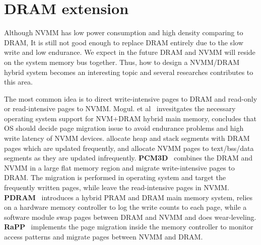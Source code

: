 \section{DRAM extension} 
\label{sec:migration}

Although NVMM has low power consumption and high density comparing to DRAM,
It is still not good enough to replace DRAM entirely due to the slow write
and low endurance. We expect in the future DRAM and NVMM
will reside on the system memory bus together. Thus, how to design a
NVMM/DRAM hybrid system becomes an interesting
topic and several researches contributes to this area.

The most common idea is to direct write-intensive pages to DRAM and read-only
or read-intensive pages to NVMM.
Mogul. et al~\cite{Mogul} invesitgates the necessary operating system support
for NVM+DRAM hybrid main memory, concludes that OS should decide page
migration issue to avoid endurance problems and high write latency of NVMM
devices.
\cite{pcmalloc} allocate heap and stack segments with DRAM pages which are
updated frequently, and allocate NVMM pages to text/bss/data segments as
they are updated infrequently.
\textbf{PCM3D}~\cite{pcm3d} combines the DRAM
and NVMM in a large flat memory region and migrate write-intensive pages
to DRAM. The migration is performed in operating system and target the
frequently written pages, while leave the read-intensive pages in NVMM.
\textbf{PDRAM}~\cite{pdram} introduces a hybrid PRAM and DRAM main memory
system, 
relies on a hardware memory controller to log the write counts to each page,
while a software module swap pages between DRAM and NVMM and does wear-leveling.
\textbf{RaPP}~\cite{RaPP} implements the page migration inside the memory
controller to monitor access patterns and migrate pages between NVMM and DRAM. 

